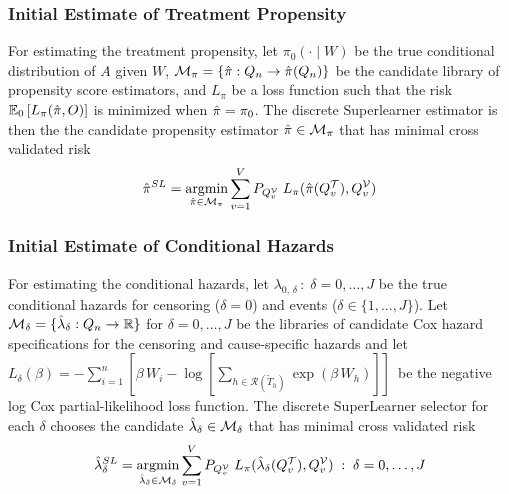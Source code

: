 \documentclass{report}
\DeclareMathOperator*{\argmin}{argmin}
\newcommand{\1}{\ensuremath{\mathbf{1}}}
\newcommand{\T}{\ensuremath{\widetilde{T}}}
\newcommand{\X}{\ensuremath{{W}}}
\newcommand{\g}{\ensuremath{\pi}}
\renewcommand{\L}{\ensuremath{W}}
\begin{document}
\subsubsection{Initial Estimate of Treatment Propensity}
\label{trtps-est}
For estimating the treatment propensity, let \(\g_0(\cdot \mid \X)\) be the true conditional distribution of \(A\) given \(\X\), \(\mathcal{M}_{\g} = \left\{\Hat{\g} : Q_n \to \Hat{\g}(Q_n) \right\}\) be the candidate library of propensity score estimators, and \(L_\g\) be a loss function such that the risk \(\mathbb{E}_0\left[L_\g(\Hat{\g}, O)\right]\) is minimized when \(\Hat{\g} = \g_0\). The discrete Superlearner estimator is then the the candidate propensity estimator \(\Hat{\g} \in \mathcal{M}_{\g}\) that has minimal cross validated risk
\begin{equation}
\Hat{\g}^{SL} = \argmin_{\Hat{\g} \in \mathcal{M}_\g} \sum_{v = 1}^{V} P_{Q^\mathcal{V}_v} \; L_\g(\Hat{\g}(Q^\mathcal{T}_v), Q^\mathcal{V}_v) \label{propsl}
\end{equation}

\subsubsection{Initial Estimate of Conditional Hazards}
\label{haz-est}
For estimating the conditional hazards, let \(\lambda_{0,\,\delta} \,:\; \delta = 0, \dots, J\) be the true conditional hazards for censoring (\(\delta = 0\)) and events (\(\delta \in \{1, \dots, J\}\)). Let \(\mathcal{M}_\delta = \{\Hat{\lambda}_\delta : Q_n \to \mathbb{R}\}\) for \(\delta = 0, \dots, J\) be the libraries of candidate Cox hazard specifications for the censoring and cause-specific hazards and let \(L_\delta(\beta) = - \sum_{i=1}^{n} \left[\beta\,\L_i - \log\left[\sum_{h \in \mathcal{R}(\T_h)} \exp(\beta\,\L_h)\right]\right] \,\) be the negative log Cox partial-likelihood loss function. The discrete SuperLearner selector for each \(\delta\) chooses the candidate \(\Hat{\lambda}_\delta \in \mathcal{M}_\delta\) that has minimal cross validated risk 
\begin{equation}
\Hat{\lambda}_\delta^{SL} = \argmin_{\Hat{\lambda}_\delta \in \mathcal{M}_\delta} \sum_{v = 1}^{V} P_{Q^\mathcal{V}_v} \; L_\g(\Hat{\lambda}_\delta(Q^\mathcal{T}_v), Q^\mathcal{V}_v) \;:\; \delta = 0, \dots, J\label{hazsl}
\end{equation}
\end{document}
